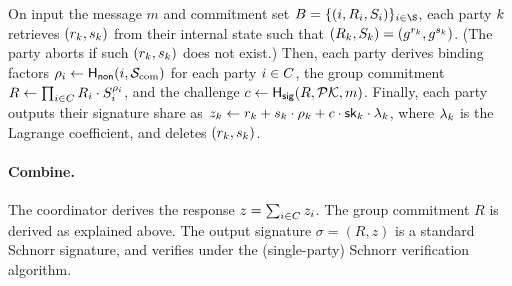 On input the message $m$ and commitment set $B = \{ (i, R_i, S_i) \}_{i \in \S}$, 
each party $k$ retrieves $(r_{k}, s_{k})$ from their internal state such that $(R_k, S_k) = (g^{r_{k}}, g^{s_{k}})$.
(The party aborts if such $(r_{k}, s_{k})$ does not exist.) 
Then, each party derives binding factors $\rho_i \gets \mathsf{H_{non}}(i, \mathcal{S}_{\rm com})$  for each party $i \in C$, the group commitment    $R \gets \prod_{i \in C} R_{i} \cdot  S_{i}^{\rho_i}$, and the challenge
$c \gets \mathsf{H_{sig}}(R, \mathcal{PK}, m)$.
Finally, each party outputs their signature share as
$z_k \gets r_{k} + s_{k} \cdot \rho_k + c \cdot \mathsf{sk}_k \cdot \lambda_k$,
where $\lambda_k$ is the Lagrange coefficient, 
and deletes $(r_{k}, s_{k})$. 


\paragraph{Combine.}
The coordinator derives the response $z = \sum_{i \in C} z_i$. 
The group commitment $R$ is derived as explained above.
The output signature $\sigma = (R,z)$ is a standard Schnorr signature,
and verifies under the (single-party) Schnorr verification algorithm. 

